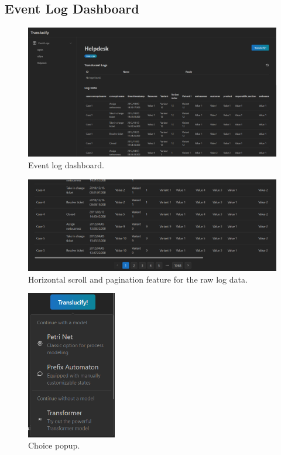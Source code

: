 \subsection{Event Log Dashboard}

\begin{figure}[H]
    \centering
    \includegraphics[width=\textwidth]{figures/screenshots/loghome.png}
    \caption{Event log dashboard.}
    \label{fig:log-home}
\end{figure}

\begin{figure}[H]
    \centering
    \includegraphics[width=\textwidth]{figures/screenshots/pagination.png}
    \caption{Horizontal scroll and pagination feature for the raw log data.}
    \label{fig:pagination}
\end{figure}

\begin{figure}    
    \centering
    \includegraphics[width=0.35\textwidth]{figures/screenshots/translucify.png}
    \caption{Choice popup.}
    \label{fig:choice-popup}
\end{figure}

